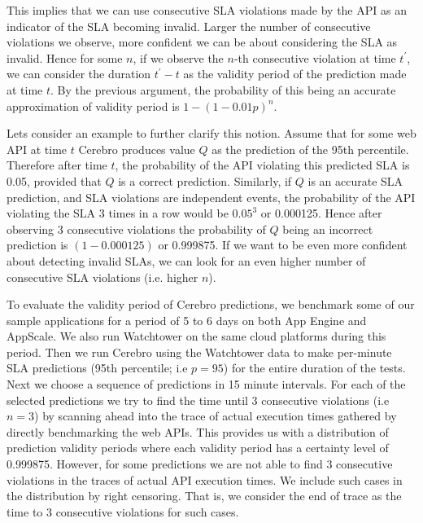 This implies that we can use consecutive SLA violations made by the API as an indicator of the SLA becoming
invalid. Larger the number of consecutive violations we observe, more confident we can be about considering the SLA as invalid. 
Hence for some $n$, if we observe
the $n$-th consecutive violation at time $t^\prime$, we can consider the duration $t^\prime - t$ as the validity period of the prediction made 
at time $t$. By the previous argument, the probability of this being an accurate approximation of validity period is $1 - (1-0.01p)^n$.

Lets consider an example to further clarify this notion. Assume that for some web API at time $t$ Cerebro produces value $Q$ as the 
prediction of the 95th percentile. Therefore after time $t$, the probability of the API violating this predicted SLA is 0.05, provided
that $Q$ is a correct prediction. Similarly, if $Q$ is an accurate SLA prediction, and SLA violations are independent events, the probability of the API
violating the SLA 3 times in a row would be $0.05^3$ or 0.000125. Hence after observing 3 consecutive violations the probability of $Q$
being an incorrect prediction is $(1 - 0.000125)$ or 0.999875. If we want to be even more confident about detecting invalid SLAs, 
we can look for an even higher
number of consecutive SLA violations (i.e. higher $n$).  

To evaluate the validity period of Cerebro predictions, we benchmark some of our sample applications for a period of 5 to 6 days on both
App Engine and AppScale. We also run Watchtower on the same cloud platforms during this period. Then we run Cerebro using
the Watchtower data to make per-minute SLA predictions (95th percentile; i.e $p=95$) for the entire duration of the tests. Next we choose a sequence of predictions
in 15 minute intervals. For each of the selected predictions we try to find the time until 3 consecutive violations (i.e $n=3$) by scanning ahead into the trace of
actual execution times gathered by directly benchmarking the web APIs. This provides us with a distribution of prediction validity periods where
each validity period has a certainty level of 0.999875.
However, for some predictions we are not able to find 3 consecutive violations in the traces of actual API execution times. We include
such cases in the distribution by right censoring. That is, we consider the end of trace as the time to 3 consecutive violations for such cases.

